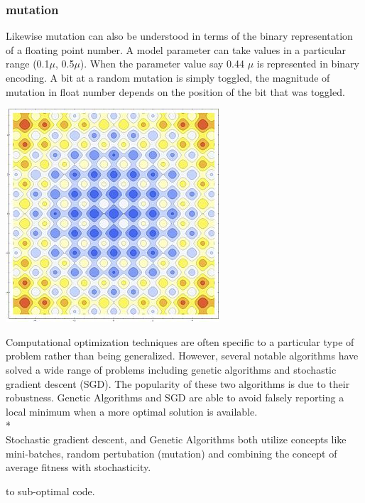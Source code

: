 \subsubsection{mutation}
Likewise mutation can also be understood in terms of the binary representation of a floating point number. A model parameter can take values in a particular range (0.1$\mu$, 0.5$\mu$). When the parameter value say 0.44 $\mu$ is represented in binary encoding. A bit at a random mutation is simply toggled, the magnitude of mutation in float number depends on the position of the bit that was toggled.

\includegraphics[]{figures/rastagrind.jpg}


Computational optimization techniques are often specific to a particular type of problem rather than being generalized. However, several notable algorithms have solved a wide range of problems including genetic algorithms and stochastic gradient descent (SGD). The popularity of these two algorithms is due to their robustness. Genetic Algorithms and SGD are able to avoid falsely reporting a local minimum when a more optimal solution is available.\\*
\\
Stochastic gradient descent, and Genetic Algorithms both utilize concepts like mini-batches, random pertubation (mutation) and combining the concept of average fitness with stochasticity. 


to sub-optimal code.\\
\\

